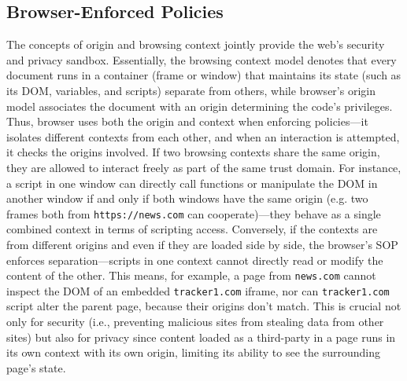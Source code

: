 \subsection{Browser-Enforced Policies}
%
The concepts of origin and browsing context jointly provide the web’s security and privacy sandbox.
%
Essentially, the browsing context model denotes that every document runs in a container (frame or window) that maintains its state (such as its DOM, variables, and scripts) separate from others, while browser's origin model associates the document with an origin determining the code’s privileges.
%
Thus, browser uses both the origin and context when enforcing policies---it isolates different contexts from each other, and when an interaction is attempted, it checks the origins involved.
%
If two browsing contexts share the same origin, they are allowed to interact freely as part of the same trust domain.
%
For instance, a script in one window can directly call functions or manipulate the DOM in another window if and only if both windows have the same origin (e.g. two frames both from \texttt{https://news.com} can cooperate)---they behave as a single combined context in terms of scripting access.
%
Conversely, if the contexts are from different origins and even if they are loaded side by side, the browser’s SOP enforces separation---scripts in one context cannot directly read or modify the content of the other.
%
This means, for example, a page from \texttt{news.com} cannot inspect the DOM of an embedded \texttt{tracker1.com} iframe, nor can \texttt{tracker1.com} script alter the parent page, because their origins don’t match.
%
%
This is crucial not only for security (i.e., preventing malicious sites from stealing data from other sites) but also for privacy since content loaded as a third-party in a page runs in its own context with its own origin, limiting its ability to see the surrounding page’s state.

